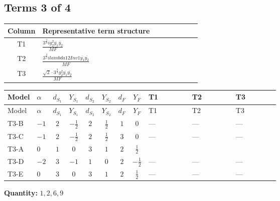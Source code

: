 \documentclass[8pt]{article}
\begin{document}
\begin{landscape}
\subsection*{Terms 3 of 4}
\begin{center}
\begin{tabular}{@{}c >{\raggedright\arraybackslash}p{0.82\linewidth}@{}}
\toprule
Column & Representative term structure \\
\midrule
T1 & \(\displaystyle \frac{3^{\frac{3}{4}} i g_{2}^{2} \overline{y_{1}} \overline{y_{2}}}{MF}\) \\
\midrule
T2 & \(\displaystyle \frac{3^{\frac{3}{4}} i lambda12Inv1 \overline{y_{1}} \overline{y_{2}}}{MF}\) \\
\midrule
T3 & \(\displaystyle \frac{\sqrt{2} \cdot 3^{\frac{3}{4}} g_{2}^{2} \overline{y_{1}} \overline{y_{2}}}{MF}\) \\
\midrule
\bottomrule
\end{tabular}
\end{center}
\smallskip
\tiny
\begin{longtable}{@{}llcccccc >{\raggedright\arraybackslash}p{0.21\linewidth} >{\raggedright\arraybackslash}p{0.21\linewidth} >{\raggedright\arraybackslash}p{0.21\linewidth}@{}}
\toprule
Model & $\alpha$ & $d_{S_1}$ & $Y_{S_1}$ & $d_{S_2}$ & $Y_{S_2}$ & $d_F$ & $Y_F$ & T1 & T2 & T3 \\
\midrule
\endfirsthead
\toprule
Model & $\alpha$ & $d_{S_1}$ & $Y_{S_1}$ & $d_{S_2}$ & $Y_{S_2}$ & $d_F$ & $Y_F$ & T1 & T2 & T3 \\
\midrule
\endhead
T3-B & $-1$ & $2$ & $-\frac{1}{2}$ & $2$ & $\frac{1}{2}$ & $1$ & $0$ & --- & --- & --- \\
\midrule
T3-C & $-1$ & $2$ & $-\frac{1}{2}$ & $2$ & $\frac{1}{2}$ & $3$ & $0$ & --- & --- & --- \\
\midrule
T3-A & $0$ & $1$ & $0$ & $3$ & $1$ & $2$ & $\frac{1}{2}$ & \scriptsize\adjustbox{max width=\linewidth}{$\begin{gathered} - \frac{25 \cdot 3^{\frac{3}{4}} i g_{2}^{2} \overline{y_{1}} \overline{y_{2}}}{24 MF}\end{gathered}$} & \scriptsize\adjustbox{max width=\linewidth}{$\begin{gathered} - \frac{3^{\frac{3}{4}} i lambda12Inv1 \overline{y_{1}} \overline{y_{2}}}{6 MF}\end{gathered}$} & \scriptsize\adjustbox{max width=\linewidth}{$\begin{gathered} - \frac{\sqrt{2} \cdot 3^{\frac{3}{4}} g_{2}^{2} \overline{y_{1}} \overline{y_{2}}}{6 MF}\end{gathered}$} \\
\midrule
T3-D & $-2$ & $3$ & $-1$ & $1$ & $0$ & $2$ & $-\frac{1}{2}$ & --- & --- & --- \\
\midrule
T3-E & $0$ & $3$ & $0$ & $3$ & $1$ & $2$ & $\frac{1}{2}$ & --- & --- & --- \\
\midrule
\bottomrule
\end{longtable}
\clearpage
\noindent\textbf{Quantity: }$\mathrm{1,2,6,9}$\par\smallskip

\end{landscape}
\end{document}
